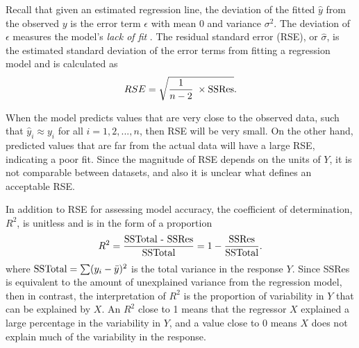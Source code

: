 Recall that given an estimated regression line, the deviation of the fitted \(\hat{y}\) from the observed \(y\) is the error term \(\epsilon\) with mean 0 and variance \(\sigma^2\). The deviation of \(\epsilon\) measures the model's \emph{lack of fit} \cite{ISLR}. The residual standard error (RSE), or \(\hat{\sigma}\), is the estimated standard deviation of the error terms from fitting a regression model and is calculated as 
\[
    RSE = \sqrt{\frac{1}{n-2}\; \times \textup{SSRes}}.
\]

When the model predicts values that are very close to the observed data, such that \(\hat{y}_i \approx y_i\) for all \(i=1,2,...,n\), then RSE will be very small. On the other hand, predicted values that are far from the actual data will have a large RSE, indicating a poor fit. Since the magnitude of RSE depends on the units of \(Y\), it is not comparable between datasets, and also it is unclear what defines an acceptable RSE. 

In addition to RSE for assessing model accuracy, the coefficient of determination, \(R^2\), is unitless and is in the form of a proportion 
\[
    R^2 = \frac{\textup{SSTotal - SSRes}}{\textup{SSTotal}} = 1-\frac{\textup{SSRes}}{\textup{SSTotal}}.
\]
where \(\textup{SSTotal} = \sum (y_i - \bar{y})^2\) is the total variance in the response \(Y\). Since SSRes is equivalent to the amount of unexplained variance from the regression model, then in contrast, the interpretation of \(R^2\) is the proportion of variability in \(Y\) that can be explained by \(X\). An \(R^2\) close to 1 means that the regressor \(X\) explained a large percentage in the variability in \(Y\), and a value close to 0 means \(X\) does not explain much of the variability in the response.



